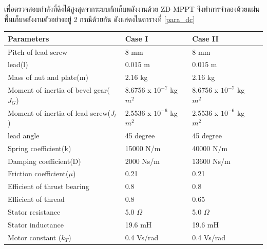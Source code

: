\documentclass[11pt,a4paper]{article}
\begin{document}
เพื่อตรวจสอบกำลังที่ดึงได้สูงสุดจากระบบกักเก็บพลังงานด้วย ZD-MPPT จึงทำการจำลองด้วยแผ่นพื้นเก็บพลังงานตัวอย่างอยู่ 2 กรณีด้วยกัน ดังแสดงในตารางที่ \ref{para_dc}

\begin{table}[H]
    \centering
    \begin{tabular}{ | l | l | l | p{5cm} |}
        \hline
        \textbf{Parameters}                      & \textbf{Case I}            & \textbf{Case II}           \\ \hline
        Pitch of lead screw                      & 8 mm                       & 8 mm                       \\ \hline
        lead(l)                                  & 0.015 m                    & 0.015 m                    \\ \hline
        Mass of nut and plate(m)                 & 2.16 kg                    & 2.16 kg                    \\ \hline
        Moment of inertia of bevel gear($J_{G}$) & 8.6756 x $10^{-7}$ kg$m^2$ & 8.6756 x $10^{-7}$ kg$m^2$ \\ \hline
        Moment of inertia of lead screw($J_{l}$) & 2.5536 x $10^{-6}$ kg$m^2$ & 2.5536 x $10^{-6}$ kg$m^2$ \\ \hline
        lead angle                               & 45 degree                  & 45 degree                  \\ \hline
        Spring coefficient(k)                    & 15000 N/m                  & 40000 N/m                  \\ \hline
        Damping coefficient(D)                   & 2000 Ns/m                  & 13600 Ns/m                 \\ \hline
        Friction coefficient($\mu$)              & 0.21                       & 0.21                       \\ \hline
        Efficient of thrust bearing              & 0.8                        & 0.8                        \\ \hline
        Efficient of thread                      & 0.8                        & 0.65                       \\ \hline
        Stator resistance                        & 5.0 $\Omega$               & 5.0 $\Omega$               \\ \hline
        Stator inductance                        & 19.6 mH                    & 19.6 mH                    \\ \hline
        Motor constant ($k_{T}$)                 & 0.4 Vs/rad                 & 0.4 Vs/rad                 \\ \hline

\end{tabular}
\end{table}
\end{document}

